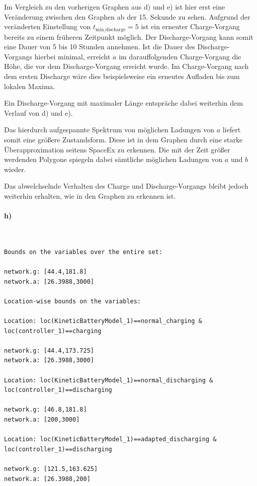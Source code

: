 Im Vergleich zu den vorherigen Graphen aus d) und e) ist hier erst eine Veränderung zwischen den Graphen ab der 15. Sekunde zu sehen. Aufgrund der veränderten Einstellung von $t_{\text{min\_discharge}}=5$ ist ein erneuter Charge-Vorgang bereits zu einem früheren Zeitpunkt möglich. Der Discharge-Vorgang kann somit eine Dauer von 5 bis 10 Stunden annehmen. Ist die Dauer des Discharge-Vorgangs hierbei minimal, erreicht $a$ im darauffolgenden Charge-Vorgang die Höhe, die vor dem Discharge-Vorgang erreicht wurde. Im Charge-Vorgang nach dem ersten Discharge wäre dies beispielsweise ein erneutes Aufladen bis zum lokalen Maxima. 

Ein Discharge-Vorgang mit maximaler Länge entspräche dabei weiterhin dem Verlauf von d) und e). 

Das hierdurch aufgespannte Spektrum von möglichen Ladungen von $a$ liefert somit eine größere Zustandsform. Diese ist in dem Graphen durch eine starke Überapproximation seitens SpaceEx zu erkennen. Die mit der Zeit größer werdenden Polygone spiegeln dabei sämtliche möglichen Ladungen von $a$ und $b$ wieder.
 

Das abwelchselnde Verhalten des Charge und Discharge-Vorgangs bleibt jedoch weiterhin erhalten, wie in den Graphen zu erkennen ist. 

\paragraph{h)}\mbox{} \\



	
\begin{lstlisting}
Bounds on the variables over the entire set:

network.g: [44.4,181.8]
network.a: [26.3988,3000]

Location-wise bounds on the variables:

Location: loc(KineticBatteryModel_1)==normal_charging & 
loc(controller_1)==charging

network.g: [44.4,173.725]
network.a: [26.3988,3000]

Location: loc(KineticBatteryModel_1)==normal_discharging & 
loc(controller_1)==discharging

network.g: [46.8,181.8]
network.a: [200,3000]

Location: loc(KineticBatteryModel_1)==adapted_discharging & 
loc(controller_1)==discharging

network.g: [121.5,163.625]
network.a: [26.3988,200]

\end{lstlisting}

